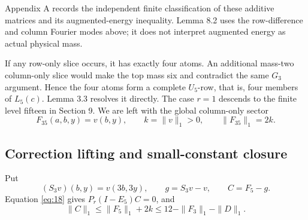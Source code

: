\documentclass[11pt]{amsart}
\numberwithin{theorem}{section}
\theoremstyle{remark}
\numberwithin{equation}{section}
\begin{document}
Appendix A records the independent finite classification of these
additive matrices and its augmented-energy inequality. Lemma 8.2 uses
the row-difference and column Fourier modes above; it does not interpret
augmented energy as actual physical mass.

If any row-only slice occurs, it has exactly four atoms. An additional
mass-two column-only slice would make the top mass six and contradict
the same \(G_3\) argument. Hence the four atoms form a complete
\(U_5\)-row, that is, four members of \(L_5(c)\). Lemma 3.3 resolves
it directly. The case \(r=1\) descends to the finite level fifteen in
Section 9. We are left with the global column-only sector
\[
F_{35}(a,b,y)=v(b,y),\qquad k=\|v\|_1>0,\qquad\|F_{35}\|_1=2k.
\tag{20}\label{eq:20}
\]

\subsection{Correction lifting and small-constant closure}\label{sec:8.1}

Put
\[
(S_3v)(b,y)=v(3b,3y),\qquad g=S_3v-v,\qquad C=F_5-g.
\]
Equation \eqref{eq:18} gives \(P_r(I-E_5)C=0\), and
\[
\|C\|_1\le\|F_5\|_1+2k\le12-\|F_3\|_1-\|D\|_1.
\tag{21}\label{eq:21}
\]
\end{document}
